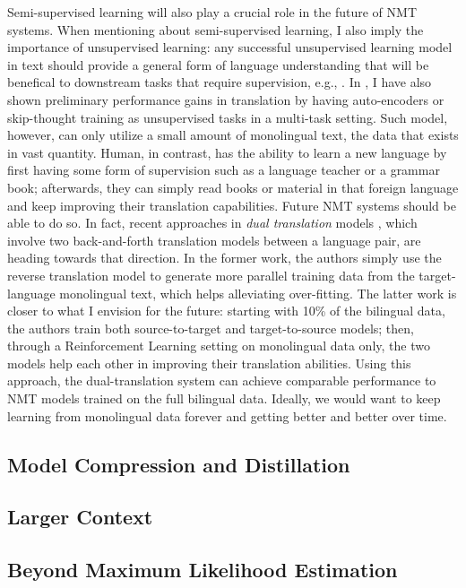 Semi-supervised learning will also play a crucial role in the future of NMT systems. When mentioning about semi-supervised learning, I also imply the importance of unsupervised learning: any successful unsupervised learning model in text should provide a general form of language understanding that will be benefical to downstream tasks that require supervision, e.g., \cite{dai15}.
In , I have also shown preliminary performance gains in translation by having auto-encoders or skip-thought training as unsupervised tasks in a multi-task setting. Such model, however, can only utilize a small amount of monolingual text, the data that exists in vast quantity. Human, in contrast, has the ability to learn a new language by first having some form of supervision such as a language teacher or a grammar book; afterwards, they can simply read books or material in that foreign language and keep improving their translation capabilities. Future NMT systems should be able to do so. In fact, recent approaches in {\it dual translation} models \cite{sennrich16mono,xia16}, which involve two back-and-forth translation models between a language pair, are heading towards that direction. In the former work, the authors simply use the reverse translation model to generate more parallel training data from the target-language monolingual text, which helps alleviating over-fitting. The latter work is closer to what I envision for the future: starting with 10\% of the bilingual data, the authors train both source-to-target and target-to-source models; then, through a Reinforcement Learning setting on monolingual data only, the two models help each other in improving their translation abilities. Using this approach, the dual-translation system can achieve comparable performance to NMT models trained on the full bilingual data. Ideally, we would want to keep learning from monolingual data forever and getting better and better over time.


\subsection{Model Compression and Distillation}
\subsection{Larger Context}
\subsection{Beyond Maximum Likelihood Estimation}
\cite{xia16,tu16}
